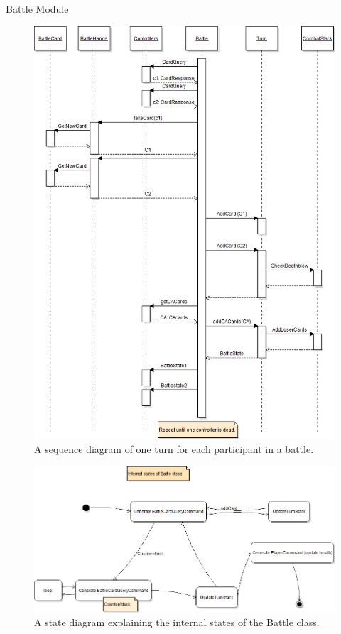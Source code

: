 Battle Module
\begin{figure}[h]
\centering
\begin{center}
\includegraphics{diagrams/BattleSequenceDiagram.png}
\end{center}
\caption{A sequence diagram of one turn for each participant in a battle.}
\label{fig:battle_sequence_diagram}
\end{figure}

\begin{figure}[h]
\centering
\begin{center}
\includegraphics{diagrams/BattleStateDiagram.png}
\end{center}
\caption{A state diagram explaining the internal states of the Battle class.}
\label{fig:battle_state_diagram}
\end{figure}



